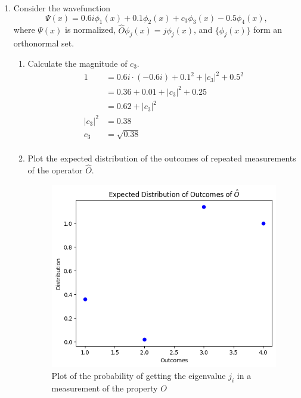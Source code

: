 \documentclass{article}
\begin{document}
\begin{enumerate}[label=\textbf{\arabic*.}]
    \item Consider the wavefunction
    \[
    \Psi (x) = 0.6i\phi_1 (x) + 0.1\phi_2 (x) + c_3\phi_3 (x) - 0.5\phi_4 (x),
    \]
    where \( \Psi (x) \) is normalized, \( \hat{O}\phi_j (x) = j\phi_j (x) \), and \( \{\phi_j (x)\} \) form an orthonormal set.
    \begin{enumerate}[label=\textbf{(\alph*)}]
        \item Calculate the magnitude of \( c_3 \).
        \begin{align*}
            1       &= 0.6i \cdot (-0.6i) + 0.1^2 + |c_3|^2 + 0.5^2 \\
                    &= 0.36 + 0.01 + |c_3|^2 + 0.25 \\
                    &= 0.62 + |c_3|^2 \\
            |c_3|^2 &= 0.38 \\
            c_3 &= \sqrt{0.38} \\
        \end{align*}
        \item Plot the expected distribution of the outcomes of repeated measurements of the operator \( \hat{O} \).
        \begin{figure}
            \centering
            \includegraphics[width=0.5\linewidth]{2-b answer.png}
            \caption{Plot of the probability of getting the eigenvalue $j_i$ in a measurement of the property $O$}
            \label{fig:enter-label}
        \end{figure}
        

\end{enumerate}
\end{enumerate}
\end{document}
